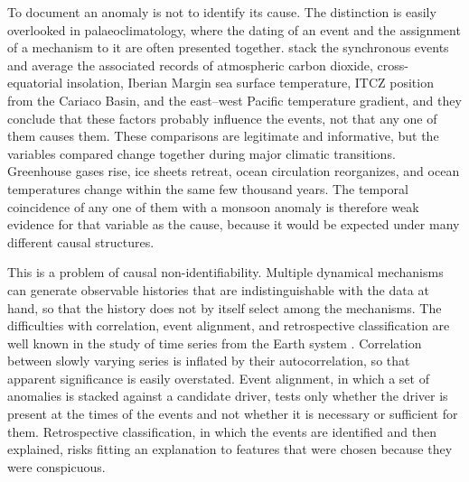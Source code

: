 \documentclass[11pt]{article}
\theoremstyle{definition}
\begin{document}
To document an anomaly is not to identify its cause. The distinction is easily overlooked in palaeoclimatology, where the dating of an event and the assignment of a mechanism to it are often presented together. \citeauthor{olson2026} stack the synchronous events and average the associated records of atmospheric carbon dioxide, cross-equatorial insolation, Iberian Margin sea surface temperature, ITCZ position from the Cariaco Basin, and the east--west Pacific temperature gradient, and they conclude that these factors probably influence the events, not that any one of them causes them. These comparisons are legitimate and informative, but the variables compared change together during major climatic transitions. Greenhouse gases rise, ice sheets retreat, ocean circulation reorganizes, and ocean temperatures change within the same few thousand years. The temporal coincidence of any one of them with a monsoon anomaly is therefore weak evidence for that variable as the cause, because it would be expected under many different causal structures.

This is a problem of causal non-identifiability. Multiple dynamical mechanisms can generate observable histories that are indistinguishable with the data at hand, so that the history does not by itself select among the mechanisms. The difficulties with correlation, event alignment, and retrospective classification are well known in the study of time series from the Earth system \citep{runge2019}. Correlation between slowly varying series is inflated by their autocorrelation, so that apparent significance is easily overstated. Event alignment, in which a set of anomalies is stacked against a candidate driver, tests only whether the driver is present at the times of the events and not whether it is necessary or sufficient for them. Retrospective classification, in which the events are identified and then explained, risks fitting an explanation to features that were chosen because they were conspicuous.
\end{document}
